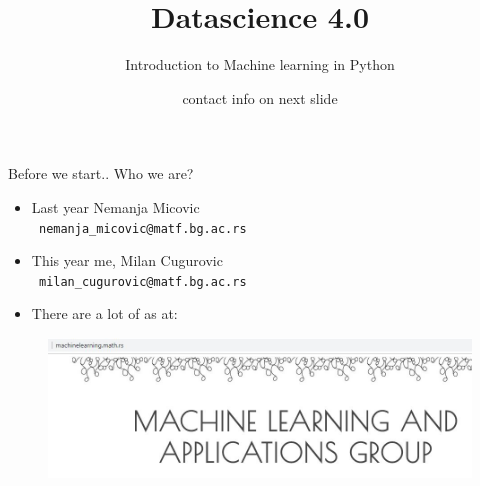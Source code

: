 \documentclass[aspectratio=169]{beamer}
\title{\Large{Datascience 4.0}}
\subtitle{Introduction to Machine learning in Python}
\author{contact info on next slide}
\begin{document}
\begin{frame}
    \maketitle
\end{frame}

\begin{frame}{Before we start.. Who we are?}
    \begin{itemize}
        \item Last year Nemanja Micovic \\\texttt{          nemanja\_micovic@matf.bg.ac.rs}
        \item This year me, Milan Cugurovic \\\texttt{         milan\_cugurovic@matf.bg.ac.rs}
        \item There are a lot of as at:
    \end{itemize}
    \begin{center}
        \begin{figure}
            \includegraphics[scale=0.5]{./images/ml.JPG}
        \end{figure}
    \end{center}
\end{frame}
\end{document}
